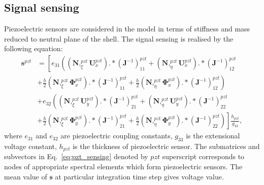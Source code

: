 \documentclass[preprint,12pt]{elsarticle}
\renewcommand{\vec}[1]{\mathbf{#1}}
\renewcommand{\bm}[1]{\mathbf{#1}}
\newcommand{\bs}[1]{\boldsymbol{#1}}
\begin{document}
	\subsection{Signal sensing}
	Piezoelectric sensors are considered in the model in terms of stiffness and mass reduced to neutral plane of the shell. The signal sensing is realised by the following equation:
	\begin{equation}
	\begin{split}
	\vec{s}^{pzt} &= \left[ e_{31}\left((\bm{N},_{\xi}^{pzt}\vec{U}_x^{pzt}).*(\vec{J}^{-1})_{11}^{pzt} + (\bm{N},_{\eta}^{pzt}\vec{U}_x^{pzt}).*(\vec{J}^{-1})_{12}^{pzt} \right.\right.\\
	&+ \frac{h}{2} (\bm{N},_{\xi}^{pzt}\bs{\Phi}_x^{pzt}).*(\vec{J}^{-1})_{11}^{pzt} + \frac{h}{2} \left.(\bm{N},_{\eta}^{pzt}\bs{\Phi}_x^{pzt}).*(\vec{J}^{-1})_{12}^{pzt}\right)\\
	&+ e_{32}\left((\bm{N},_{\xi}^{pzt}\vec{U}_y^{pzt}).*(\vec{J}^{-1})_{21}^{pzt} + (\bm{N},_{\eta}^{pzt}\vec{U}_y^{pzt}).*(\vec{J}^{-1})_{22}^{pzt} \right.\\
	&+ \frac{h}{2} (\bm{N},_{\xi}^{pzt}\bs{\Phi}_y^{pzt}).*(\vec{J}^{-1})_{21}^{pzt} + \frac{h}{2} \left.\left.(\bm{N},_{\eta}^{pzt}\bs{\Phi}_y^{pzt}).*(\vec{J}^{-1})_{22}^{pzt}\right)\right] \frac{h_{pzt}}{g_{33}}, 
	\end{split}
	\label{eq:pzt_sensing}
	\end{equation}
	where $e_{31}$ and $e_{32}$ are piezoelectric coupling constants, $g_{33}$ is the extensional voltage constant, $h_{pzt}$ is the thickness of piezoelectric sensor. The submatrices and subvectors in Eq.~\ref{eq:pzt_sensing} denoted by $pzt$ superscript corresponds to nodes of appropriate spectral elements which form piezoelectric sensors. The mean value of $\vec{s}$ at particular integration time step gives voltage value. 
\end{document}
